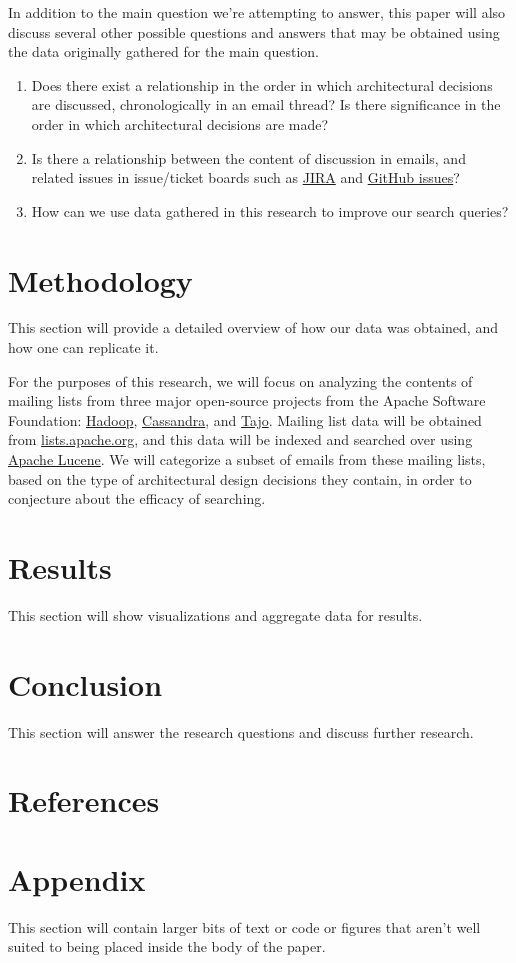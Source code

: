 \documentclass[a4paper, 12pt]{article}
\begin{document}
	In addition to the main question we're attempting to answer, this paper will also discuss several other possible questions and answers that may be obtained using the data originally gathered for the main question.
	
	\begin{enumerate}
		\item Does there exist a relationship in the order in which architectural decisions are discussed, chronologically in an email thread? Is there significance in the order in which architectural decisions are made?
		
		\item Is there a relationship between the content of discussion in emails, and related issues in issue/ticket boards such as \href{https://www.atlassian.com/software/jira}{JIRA} and \href{https://github.com/features/issues}{GitHub issues}?
		
		\item How can we use data gathered in this research to improve our search queries?
	\end{enumerate}

\section{Methodology}
	This section will provide a detailed overview of how our data was obtained, and how one can replicate it.
	
	For the purposes of this research, we will focus on analyzing the contents of mailing lists from three major open-source projects from the Apache Software Foundation: \href{https://hadoop.apache.org/}{Hadoop}, \href{https://cassandra.apache.org}{Cassandra}, and \href{https://attic.apache.org/projects/tajo.html}{Tajo}. Mailing list data will be obtained from \href{https://lists.apache.org/}{lists.apache.org}, and this data will be indexed and searched over using \href{https://lucene.apache.org/}{Apache Lucene}. We will categorize a subset of emails from these mailing lists, based on the type of architectural design decisions they contain, in order to conjecture about the efficacy of searching.

\section{Results}
	This section will show visualizations and aggregate data for results.

\section{Conclusion}
	This section will answer the research questions and discuss further research.

\section{References}
	\printbibliography[heading=none]

\section{Appendix}
	This section will contain larger bits of text or code or figures that aren't well suited to being placed inside the body of the paper.
\end{document}
